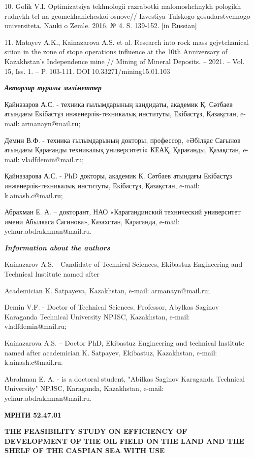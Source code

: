 10. Golik V.I. Optimizatsiya tekhnologii razrabotki malomoshchnykh
pologikh rudnykh tel na geomekhanicheskoi osnove// Izvestiya
Tul\textquotesingle skogo gosudarstvennogo universiteta. Nauki o Zemle.
2016. № 4. S. 139-152. {[}in Russian{]}

11. Matayev A.K., Kainazarova A.S. et al. Research into rock mass
gejvtchanical sition in the zone of stope operations influence at the
10th Anniversary of Kazakhstan's Independence mine // Mining of Mineral
Deposits. -- 2021. -- Vol. 15, Iss. 1. -- P. 103-111. DOI
10.33271/mining15.01.103

\emph{{\bfseries Авторлар туралы мәліметтер}}

Қайназаров А.С. - техника ғылымдарының кандидаты, академик Қ. Сәтбаев
атындағы Екібастұз инженерлік-техникалық институты, Екібастұз,
Қазақстан, e-mail: armanayn@mail.ru;

Демин В.Ф. - техника ғылымдарының докторы, профессор, «Әбілқас Сағынов
атындағы Қарағанды техникалық университеті» КЕАҚ, Қарағанды, Қазақстан,
e-mail: vladfdemin@mail.ru;

Қайназарова А.С. - PhD докторы, академик Қ. Сәтбаев атындағы Екібастұз
инженерлік-техникалық институты, Екібастұз, Қазақстан, e-mail:
k.ainash.c@mail.ru;

Абрахман Е. А. -- докторант, НАО «Карагандинский технический университет
имени Абылкаса Сагинова», Казахстан, Караганда, e-mail:
yelnur.abdrakhman@mail.ru.

\emph{{\bfseries Information about the authors}}

Kainazarov A.S. - Candidate of Technical Sciences, Ekibastuz Engineering
and Technical Institute named after

Academician K. Satpayeva, Kazakhstan, e-mail: armanayn@mail.ru;

Demin V.F. - Doctor of Technical Sciences, Professor, Abylkas Saginov
Karaganda Technical University NPJSC, Kazakhstan, e-mail:
vladfdemin@mail.ru;

Kainazarova A.S. -- Doctor PhD, Ekibastuz Engineering and technical
Institute named after academician K. Satpayev, Ekibastuz, Kazakhstan,
e-mail: k.ainash.c@mail.ru.

Abrahman E. A. - is a doctoral student, "Abilkas Saginov Karaganda
Technical University" NPJSC, Karaganda, Kazakhstan, e-mail:
yelnur.abdrakhman@mail.ru.

\emph{{\bfseries \hfill\break
}}\newpage
{\bfseries МРНТИ 52.47.01}

{\bfseries THE FEASIBILITY STUDY ON EFFICIENCY OF DEVELOPMENT OF THE OIL
FIELD ON THE LAND AND THE SHELF OF THE CASPIAN SEA WITH USE}

